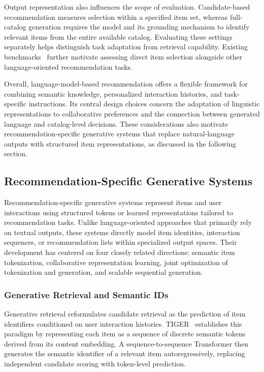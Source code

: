 \documentclass[sigconf,nonacm]{acmart}
\begin{document}
Output representation also influences the scope of evaluation.
Candidate-based recommendation measures selection within a
specified item set, whereas full-catalog generation requires
the model and its grounding mechanism to identify relevant
items from the entire available catalog. Evaluating these
settings separately helps distinguish task adaptation from
retrieval capability. Existing benchmarks~\cite{llmbench}
further motivate assessing direct item selection alongside
other language-oriented recommendation tasks.

Overall, language-model-based recommendation offers a flexible
framework for combining semantic knowledge, personalized
interaction histories, and task-specific instructions.
Its central design choices concern the adaptation of linguistic
representations to collaborative preferences and the connection
between generated language and catalog-level decisions.
These considerations also motivate recommendation-specific
generative systems that replace natural-language outputs
with structured item representations, as discussed in the
following section.


\subsection{Recommendation-Specific Generative Systems}
\label{sec:rec}

Recommendation-specific generative systems represent items and
user interactions using structured tokens or learned
representations tailored to recommendation tasks. Unlike
language-oriented approaches that primarily rely on textual
outputs, these systems directly model item identities,
interaction sequences, or recommendation lists within
specialized output spaces. Their development has centered
on four closely related directions: semantic item
tokenization, collaborative representation learning,
joint optimization of tokenization and generation, and
scalable sequential generation.

\subsubsection{Generative Retrieval and Semantic IDs}

Generative retrieval reformulates candidate retrieval as
the prediction of item identifiers conditioned on user
interaction histories. TIGER~\cite{tiger} establishes
this paradigm by representing each item as a sequence
of discrete semantic tokens derived from its content
embedding. A sequence-to-sequence Transformer then
generates the semantic identifier of a relevant item
autoregressively, replacing independent candidate
scoring with token-level prediction.
\end{document}
